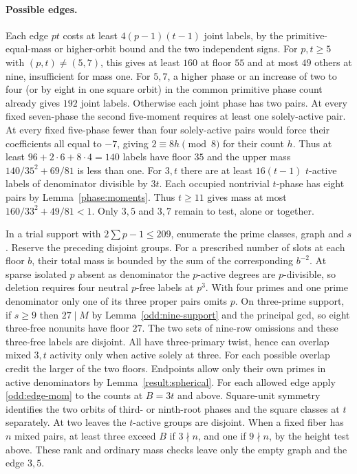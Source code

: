 \documentclass[11pt]{amsart}
\numberwithin{equation}{section}
\theoremstyle{definition}
\theoremstyle{plain}
\begin{document}
\paragraph{Possible edges.}
Each edge $pt$ costs at least $4(p-1)(t-1)$ joint labels, by the
primitive-equal-mass or higher-orbit bound and the two independent signs.
For $p,t\ge5$ with $(p,t)\ne(5,7)$, this gives at least $160$ at
floor $55$ and at most $49$ others at nine, insufficient for mass one.
For $5,7$, a higher phase or an increase of two to four (or by eight in
one square orbit) in the common primitive phase count already gives
$192$ joint labels. Otherwise each joint phase has two pairs. At every fixed seven-phase
the second five-moment requires at least one solely-active pair. At every
fixed five-phase fewer than four solely-active pairs would force their
coefficients all equal to $-7$, giving $2\equiv8h\pmod8$ for their
count $h$. Thus at least $96+2\cdot6+8\cdot4=140$ labels have floor
$35$ and the upper mass $140/35^2+69/81$ is less than one.
For $3,t$ there are at least $16(t-1)$ $t$-active labels
of denominator divisible by $3t$. Each occupied nontrivial $t$-phase
has eight pairs by Lemma~\ref{phase:moments}. Thus $t\ge11$
gives mass at most $160/33^2+49/81<1$. Only $3,5$ and $3,7$ remain
to test, alone or together.

In a trial support with $2\sum p-1\le209$, enumerate the prime classes,
graph and $s$. Reserve the preceding disjoint groups. For a prescribed
number of slots at each floor $b$, their total mass is bounded by the
sum of the corresponding $b^{-2}$. At sparse isolated $p$ absent as
denominator the $p$-active degrees are $p$-divisible, so deletion
requires four neutral $p$-free labels at $p^3$. With four primes and
one prime denominator only one of its three proper pairs omits $p$.
On three-prime support, if $s\ge9$ then $27\mid M$ by
Lemma~\ref{odd:nine-support} and the principal gcd, so eight three-free
nonunits have floor $27$. The two sets of nine-row omissions and these
three-free labels are disjoint. All have three-primary twist, hence can
overlap mixed $3,t$ activity only when active solely at three. For each
possible overlap credit the larger of the two floors. Endpoints allow
only their own primes in active denominators by Lemma~\ref{result:spherical}.
For each allowed edge apply \eqref{odd:edge-mom} to the counts at
$B=3t$ and above. Square-unit symmetry identifies the two orbits of
third- or ninth-root phases and the square classes at $t$ separately.
At two leaves the $t$-active groups are disjoint. When a fixed fiber
has $n$ mixed pairs, at least three exceed $B$ if $3\nmid n$, and
one if $9\nmid n$, by the height test above. These rank and ordinary
mass checks leave only the empty graph and the edge $3,5$.
\end{document}
